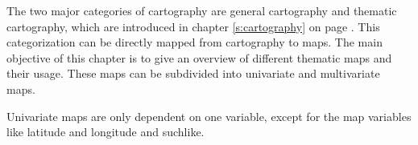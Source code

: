 The two major categories of cartography are general cartography and thematic cartography, which are introduced in chapter \ref{s:cartography} on page \pageref{s:cartography}. This categorization can be directly mapped from cartography to maps. The main objective of this chapter is to give an overview of different thematic maps and their usage. These maps can be subdivided into univariate and multivariate maps.

Univariate maps are only dependent on one variable, except for the map variables like latitude and longitude and suchlike.






\label{s:choropleth}



